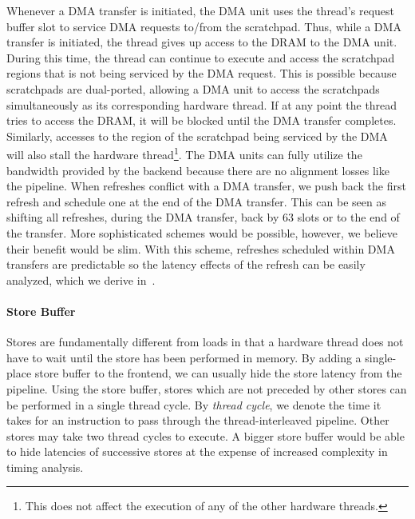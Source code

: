 Whenever a DMA transfer is initiated, the DMA unit uses the thread's request buffer slot to service DMA requests to/from the scratchpad. 
Thus, while a DMA transfer is initiated, the thread gives up access to the DRAM to the DMA unit.
During this time, the thread can continue to execute and access the scratchpad regions that is not being serviced by the DMA request. 
This is possible because scratchpads are dual-ported, allowing a DMA unit to access the scratchpads simultaneously as its corresponding hardware thread.
If at any point the thread tries to access the DRAM, it will be blocked until the DMA transfer completes.
Similarly, accesses to the region of the scratchpad being serviced by the DMA will also stall the hardware thread\footnote{This does not affect the execution of any of the other hardware threads.}.
The DMA units can fully utilize the bandwidth provided by the backend because there are no alignment losses like the pipeline. 
When refreshes conflict with a DMA transfer, we push back the first refresh and schedule one at the end of the DMA transfer. 
This can be seen as shifting all refreshes, during the DMA transfer, back by $63$ slots or to the end of the transfer.
More sophisticated schemes would be possible, however, we believe their benefit would be slim.
With this scheme, refreshes scheduled within DMA transfers are predictable so the latency effects of the refresh can be easily analyzed, which we derive in~\cite{ReinekeLiuPatelKimLee11_PRETDRAMControllerBankPrivatizationForPredictability}.

\paragraph{Store Buffer}
\label{sec:ptarm_dram_store_buffer}
Stores are fundamentally different from loads in that a hardware thread does not have to wait until the store has been performed in memory.
By adding a single-place store buffer to the frontend, we can usually hide the store latency from the pipeline.
Using the store buffer, stores which are not preceded by other stores can be performed in a single thread cycle.
By \emph{thread cycle}, we denote the time it takes for an instruction to pass through the thread-interleaved pipeline.
Other stores may take two thread cycles to execute.
A bigger store buffer would be able to hide latencies of successive stores at the expense of increased complexity in timing analysis.

